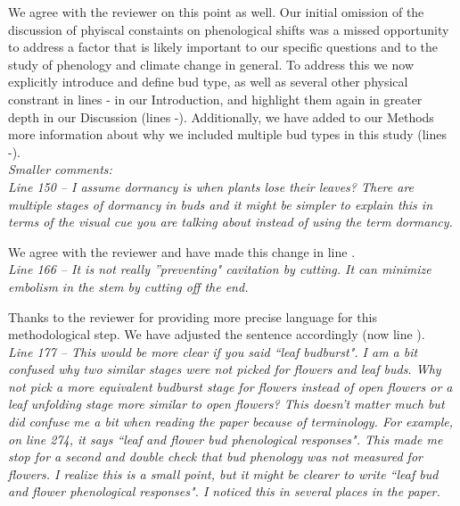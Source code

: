 \documentclass[11pt]{article}
\begin{document}
We agree with the reviewer on this point as well. Our initial omission of the discussion of phyiscal constaints on phenological shifts was a missed opportunity to address a factor that is likely important to our specific questions and to the study of phenology and climate change in general. To address this we now explicitly introduce and define bud type, as well as several other physical constrant in lines - in our Introduction, and highlight them again in greater depth in our Discussion (lines \lineref{}-\lineref{}). Additionally, we have added to our Methods more information about why we included multiple bud types in this study (lines \lineref{}-\lineref{}). \\


\emph{Smaller comments:}\\

\emph{Line 150 – I assume dormancy is when plants lose their leaves? There are multiple stages of dormancy in buds and it might be simpler to explain this in terms of the visual cue you are talking about instead of using the term dormancy.}

We agree with the reviewer and have made this change in line \lineref{}.\\

\emph{Line 166 – It is not really ''preventing" cavitation by cutting. It can minimize embolism in the stem by cutting off the end.}

Thanks to the reviewer for providing more precise language for this methodological step. We have adjusted the sentence accordingly (now line \lineref{}).\\


\emph{Line  177 – This would be more clear if you said ``leaf budburst". I am a bit confused why two similar stages were not picked for flowers and leaf buds. Why not pick a more equivalent budburst stage for flowers instead of open flowers or a leaf unfolding stage more similar to open flowers? This doesn’t matter much but did confuse me a bit when reading the paper because of terminology. For example, on line 274, it says ``leaf and flower bud phenological responses". This made me stop for a second and double check that bud phenology was not measured for flowers. I realize this is a small point, but it might be clearer to write ``leaf bud and flower phenological responses". I noticed this in several places in the paper.}\\
\end{document}
